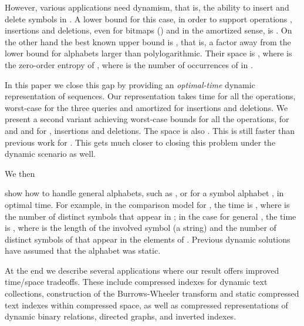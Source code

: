 \documentclass[11pt]{article}
\newcommand{\no}[1]{}
\begin{document}
However, various applications need dynamism, that is, the ability to insert and 
delete symbols in . A lower bound for this case, in order to support
operations , insertions and deletions, even for bitmaps () and
in the amortized sense, is  \cite{FS89}. On the other
hand the best known upper bound \cite{HM10,NS10} is 
, that is, a factor 
 away from the lower bound for
alphabets larger than polylogarithmic. Their space is ,
where 
is the zero-order entropy of , where  is the number of occurrences of 
 in . 

In this paper we close this gap by providing an {\em optimal-time} dynamic
representation of sequences. Our representation takes 
time for all the operations, worst-case for the three queries and amortized
for insertions and deletions. We present a second variant achieving worst-case
bounds for all the operations,  for  and 
and  for , insertions and deletions. The space is also
. This  is still faster than previous
work for . This gets much closer to
closing this problem under the dynamic scenario as well.

We then 
\no{consider some extensions of our results. First, we }
show how to 
handle general alphabets, such as , or 
 for a symbol alphabet , in optimal time. 
For example, in the comparison model for ,
the time is , where  is the number of 
distinct symbols that appear in ; in the case  for 
general , the time is , where
 is the length of the involved symbol (a string) and  the number of distinct 
symbols of  that appear in the elements of .
Previous dynamic solutions have assumed that the alphabet
 was static.

\no{ -> needs quadratic blocks, at best, but how to handle the split-find
and partial sums?
As a second extension, we enhance the set of update operations to include
sequence splitting, concatenating, and general block updates. This makes up
a much stronger algebra on sequences. The time for these operations is
, whereas the only previous solution \cite{NS10} achieved
 for any constant .
}

At the end we describe several applications where our result offers improved
time/space tradeoffs. These include compressed indexes for dynamic text 
collections, construction of the Burrows-Wheeler transform \cite{BW94} and 
static compressed text indexes within compressed space, as well as compressed
representations of dynamic binary relations, directed graphs, and inverted
indexes.
 
\end{document}
